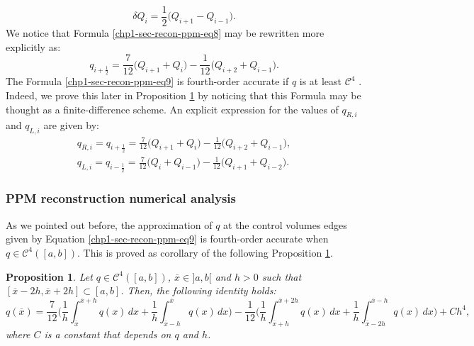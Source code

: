 \begin{equation}
	\label{chp1-sec-recon-ppm-eq8}
	\delta Q_{i} = \frac{1}{2} \bigg( Q_{i+1} - Q_{i-1} \bigg).
\end{equation}
We notice that Formula \eqref{chp1-sec-recon-ppm-eq8} may be rewritten more explicitly as:
\begin{equation}
	\label{chp1-sec-recon-ppm-eq9}
	q_{i+\frac{1}{2}} = \frac{7}{12} \bigg( Q_{i+1} + Q_{i} \bigg) - \frac{1}{12} \bigg(  Q_{i+2} +Q_{i-1}\bigg).
\end{equation}
The Formula \eqref{chp1-sec-recon-ppm-eq9} is fourth-order accurate if
$q$ is at least $\mathcal{C}^4$ \citep{colella:1984}. Indeed, we
prove this later in Proposition \ref{prop:ppm-bound1} by noticing
that this Formula may be thought as a finite-difference scheme. 
An explicit expression for the values of $q_{R,i}$ and $q_{L,i}$ are given by:
\begin{align}
	\label{chp1-sec-recon-ppm-eq10}
	q_{R,i} = q_{i+\frac{1}{2}} = \frac{7}{12} \bigg( Q_{i+1} + Q_{i} \bigg) - \frac{1}{12} \bigg(  Q_{i+2} +Q_{i-1}\bigg), \\
	\label{chp1-sec-recon-ppm-eq11}
	q_{L,i} = q_{i-\frac{1}{2}} = \frac{7}{12} \bigg( Q_{i} + Q_{i-1} \bigg) - \frac{1}{12} \bigg(  Q_{i+1} +Q_{i-2}\bigg).
\end{align}

\theoremstyle{plain}
\newtheorem{lema}{Lemma}[chapter]

\theoremstyle{plain}
\newtheorem{prop}{Proposition}[chapter]

\theoremstyle{plain}
\newtheorem{remark}{Remark}[chapter]

\theoremstyle{plain}
\newtheorem{corollary}{Corollary}[chapter]

\subsubsection{PPM reconstruction numerical analysis}
\label{chp1-sec-numerical-analysis}
As we pointed out before, the approximation of $q$ at the control volumes edges
given by Equation \eqref{chp1-sec-recon-ppm-eq9} is fourth-order accurate when $q \in \mathcal{C}^4([a,b])$. 
This is proved as corollary of the following Proposition \ref{prop:ppm-bound1}.
\begin{prop}
	\label{prop:ppm-bound1}
	Let $q \in \mathcal{C}^{4}([a,b])$, $\overline{x} \in ]a,b[ $ and $h>0$ such that 
	$[\overline{x}-2h,\overline{x}+2h] \subset [a,b]$.
	Then, the following identity holds:
	\begin{equation}
		\label{prop:ppm-bound1-eq1}
		q(\overline{x} ) = \frac{7}{12}\bigg( \frac{1}{h} \int_{\overline{x} }^{\overline{x}+h} q(x) \,dx 
		       + \frac{1}{h} \int_{\overline{x} -h}^{\overline{x} } q(x) \,dx  \bigg)
		       - \frac{1}{12}\bigg( \frac{1}{h} \int_{\overline{x} +h}^{\overline{x}+2h} q(x) \,dx 
		       + \frac{1}{h} \int_{\overline{x} -2h}^{\overline{x} -h} q(x) \,dx  \bigg) + Ch^4,
	\end{equation}
	where $C$ is a constant that depends on $q$ and $h$.
\end{prop}

